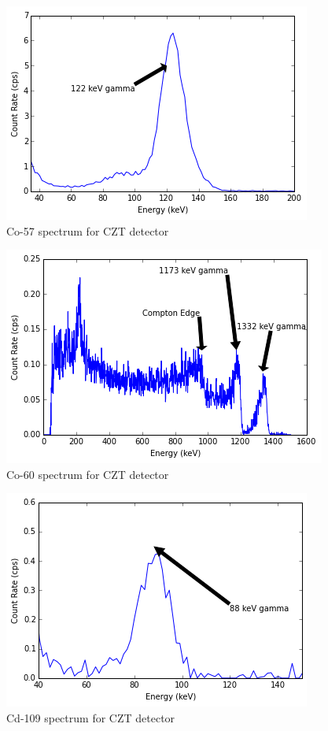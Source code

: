 \documentclass[12pt]{article}
\begin{document}
\begin{center}
\begin{figure}
	\includegraphics{czt_co57}
	\caption{Co-57 spectrum for CZT detector}
	\label{fig:co57czt}
\end{figure}
\end{center}

\begin{center}
\begin{figure}
	\includegraphics{czt_co60}
	\caption{Co-60 spectrum for CZT detector}
	\label{fig:co60czt}
\end{figure}
\end{center}

\begin{center}
\begin{figure}
	\includegraphics{czt_cd109}
	\caption{Cd-109 spectrum for CZT detector}
	\label{fig:cd109czt}
\end{figure}
\end{center}
\end{document}
